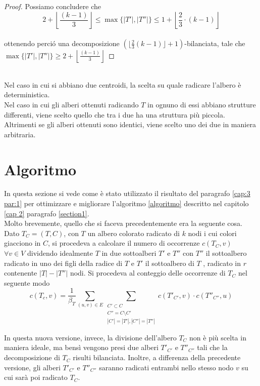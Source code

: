 \begin{proof}
Possiamo concludere che
\\

\[2 +  \left\lfloor \frac{(k-1)}{3}\right\rfloor \le \max\{|T'|,|T''|\} \le 1 + \left\lfloor \frac{2}{3} \cdot (k-1) \right\rfloor \]
 \\
ottenendo perci\'o una decomposizione $ (\lfloor \frac{2}{3}(k-1) \rfloor +1)$-bilanciata, tale che $ \max \{|T'|,|T''|\} \ge 2+ \left\lfloor \frac{(k-1)}{3}\right\rfloor $	 
 	 
\end{proof}\mbox{}\\
 
 	Nel caso in cui si abbiano due centroidi, la scelta su quale radicare l'albero  \`e deterministica.\\
 	Nel caso in cui gli alberi ottenuti radicando $ T $ in ognuno di essi abbiano strutture differenti, viene scelto quello che tra i due ha una struttura pi\`u piccola.
 	Altrimenti se gli alberi ottenuti sono identici, viene scelto uno dei due in maniera arbitraria.
 	
\section{Algoritmo}
\label{cap:3 par:2}
In questa sezione si vede come \`e stato utilizzato il risultato del paragrafo \ref{cap:3 par:1} per ottimizzare e migliorare l'algoritmo \ref{algoritmo} descritto nel capitolo \ref{cap 2} paragrafo \ref{section1}.\\
Molto brevemente, quello che si faceva precedentemente era la seguente cosa.
Dato $ T_C = (T,C) $, con $ T $ un albero colorato radicato di $ k $ nodi i cui colori giacciono in $ C $, si procedeva a calcolare il numero di occorrenze $ c(T_C,v) $ \ $ \forall v \in V $ dividendo idealmente $ T $ in due sottoalberi $ T' $ e $ T'' $ con $ T'' $ il sottoalbero radicato in uno dei figli della radice di $ T $ e $ T'$ il sottoalbero di $ T $ , radicato in $ r $ contenente $ |T | - |T'' | $ nodi. 
Si procedeva al conteggio delle occorrenze di $ T_C $ nel seguente modo
\[	c(T_c,v)=\frac{1}{\beta_T}\sum_{(u,v)\in E}\sum_{\substack{C' \subset C \\C'' = C \setminus C' \\ |C'|=|T'|, |C''| = |T''|}}c(T'_{C'},v)\cdot c(T''_{C''},u)\]   

In questa nuova versione, invece, la divisione dell'albero $ T_C $ non \`e pi\`u scelta in maniera ideale, ma bens\`i vengono presi due alberi $ T'_{C'} $ e $ T''_{C''} $ tali che la decomposizione di $ T_C $ risulti bilanciata.
Inoltre, a differenza della precedente versione, gli alberi $ T'_{C'} $ e $ T''_{C''} $ saranno radicati entrambi nello stesso nodo $ v $ su cui sar\`a poi radicato $ T_C $.



